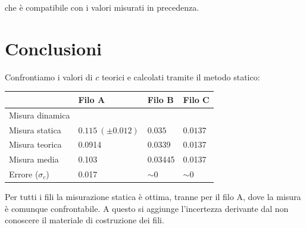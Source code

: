 che è compatibile con i valori misurati in precedenza.

\section{Conclusioni}
Confrontiamo i valori di $c$ teorici e calcolati tramite il metodo statico:
\begin{center}
\begin{tabular}{l|lll}
& Filo A & Filo B & Filo C \\
\midrule
Misura dinamica &  \\
Misura statica & $0.115\ (\pm 0.012)$ & $0.035$& $0.0137$ \\
Misura teorica & 0.0914 & 0.0339 & 0.0137 \\
\midrule
Misura media & 0.103 & 0.03445 & 0.0137\\
Errore ($\sigma_c$) & 0.017 & $\sim 0$ & $\sim 0$\\
\end{tabular}
\end{center}

Per tutti i fili la misurazione statica è ottima, tranne per il filo A, dove la misura è comunque confrontabile. A questo si aggiunge l'incertezza derivante dal non conoscere il materiale di costruzione dei fili.
